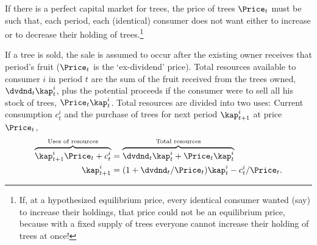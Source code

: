 \documentclass{handout}
\begin{document}
If there is a perfect capital market for trees, the price of trees $\Price_{t}$ must be such that, each period, each (identical) consumer does not want either to increase or to decrease their holding of trees.\footnote{If, at a hypothesized equilibrium price, every identical consumer wanted (say) to increase their holdings, that price could not be an equilibrium price, because with a fixed supply of trees everyone cannot increase their holding of trees at once!}

If a tree is sold, the sale is assumed to occur after the existing owner receives that period's fruit ($\Price_{t}$ is the `ex-dividend' price).  Total resources available to consumer $i$ in period $t$ are the sum of the fruit received from the trees owned, $\dvdnd_{t}\kap_{t}^{i}$, plus the potential proceeds if the consumer were to sell all his stock of trees, $\Price_{t}\kap_{t}^{i}$.  Total resources are divided into two uses: Current consumption $c_{t}^{i}$ and the purchase of trees for next period $\kap_{t+1}^{i}$ at price $\Price_{t}$,
\begin{equation}\begin{gathered}\begin{aligned}
\overbrace{\kap_{t+1}^{i}\Price_{t}+c_{t}^{i}}^{\text{Uses of resources}}     & =  \overbrace{\dvdnd_{t}\kap_{t}^{i}+\Price_{t}\kap_{t}^{i}}^{\text{Total resources}} 
\\      \kap_{t+1}^{i} & =  (1+\dvdnd_{t}/\Price_{t})\kap_{t}^{i}-c_{t}^{i}/\Price_{t}.
\end{aligned}\end{gathered}\end{equation}

\pagebreak
\end{document}
